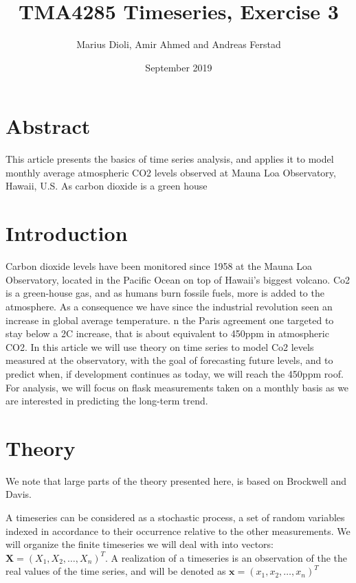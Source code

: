 \documentclass[]{article}
\title{TMA4285 Timeseries, Exercise 3}
\author{Marius Dioli, Amir Ahmed and Andreas Ferstad}
\date{September 2019}
\begin{document}
\maketitle

\hypertarget{abstract}{%
\section{Abstract}\label{abstract}}

This article presents the basics of time series analysis, and applies it
to model monthly average atmospheric CO2 levels observed at Mauna Loa
Observatory, Hawaii, U.S. As carbon dioxide is a green house

\hypertarget{introduction}{%
\section{Introduction}\label{introduction}}

Carbon dioxide levels have been monitored since 1958 at the Mauna Loa
Observatory, located in the Pacific Ocean on top of Hawaii's biggest
volcano. Co2 is a green-house gas, and as humans burn fossile fuels,
more is added to the atmosphere. As a consequence we have since the
industrial revolution seen an increase in global average temperature. n
the Paris agreement one targeted to stay below a 2C increase, that is
about equivalent to 450ppm in atmospheric CO2. In this article we will
use theory on time series to model Co2 levels measured at the
observatory, with the goal of forecasting future levels, and to predict
when, if development continues as today, we will reach the 450ppm roof.
For analysis, we will focus on flask measurements taken on a monthly
basis as we are interested in predicting the long-term trend.

\hypertarget{theory}{%
\section{Theory}\label{theory}}

We note that large parts of the theory presented here, is based on
Brockwell and Davis.

A timeseries can be considered as a stochastic process, a set of random
variables indexed in accordance to their occurrence relative to the
other measurements. We will organize the finite timeseries we will deal
with into vectors: \(\mathbf{X}= ( X_1, X_2, \dots,X_n)^T\). A
realization of a timeseries is an observation of the the real values of
the time series, and will be denoted as
\(\mathbf{x} = (x_1, x_2, \dots, x_n)^T\)
\end{document}
